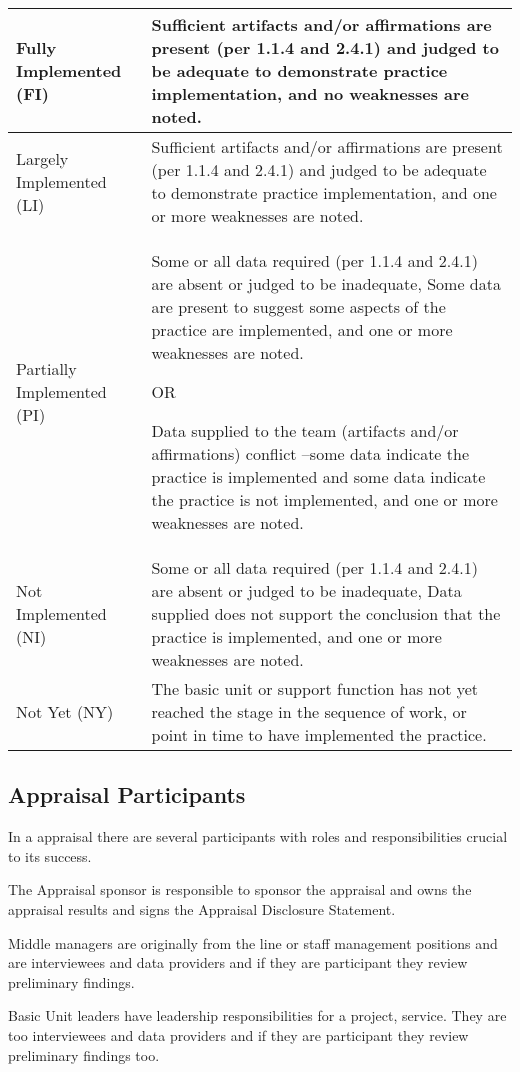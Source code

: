 \begin{tabular}{|p{4cm}|p{9cm}|}
\hline
Fully Implemented (FI)   & Sufficient artifacts and/or affirmations are present (per 1.1.4 and 2.4.1) and
judged to be adequate to demonstrate practice implementation, and
no weaknesses are noted.    \\
\hline
Largely Implemented (LI) & Sufficient artifacts and/or affirmations are present (per 1.1.4 and 2.4.1) and
judged to be adequate to demonstrate practice implementation, and
one or more weaknesses are noted.  \\ 
\hline
Partially Implemented (PI) & Some or all data required (per 1.1.4 and 2.4.1) are absent or judged to be
inadequate,
Some data are present to suggest some aspects of the practice are
implemented, and
one or more weaknesses are noted.


OR


Data supplied to the team (artifacts and/or affirmations) conflict –some data
indicate the practice is implemented and some data indicate the practice is
not implemented, and
one or more weaknesses are noted.\\
\hline
Not Implemented (NI) & Some or all data required (per 1.1.4 and 2.4.1) are absent or judged to be
inadequate,
Data supplied does not support the conclusion that the practice is
implemented, and
one or more weaknesses are noted. \\
\hline
Not Yet (NY) & The basic unit or support function has not yet reached the stage in the
sequence of work, or point in time to have implemented the practice. \\
\hline
\end{tabular} 





\subsection{Appraisal Participants}
In a appraisal there are several participants with roles and responsibilities crucial to its success.

The Appraisal sponsor is responsible to sponsor the appraisal and owns the appraisal results and signs the Appraisal Disclosure Statement.

Middle managers are originally from the line or staff management positions and are interviewees and data providers and if they are participant they review preliminary findings.

Basic Unit leaders have leadership responsibilities for a project, service. They are too interviewees and data providers and if they are participant they review preliminary findings too.

